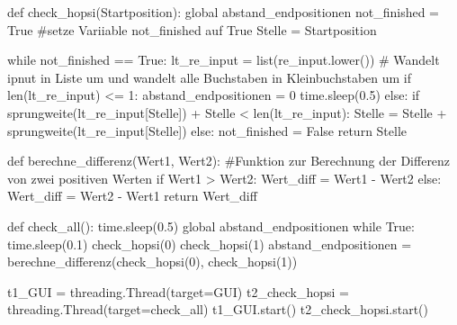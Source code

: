 \documentclass[a4paper,10pt,ngerman]{scrartcl}
\begin{document}
\begin{python}
def check_hopsi(Startposition):
    global abstand_endpositionen
    not_finished = True #setze Variiable not_finished auf True
    Stelle = Startposition

    while not_finished == True:
        lt_re_input = list(re_input.lower()) # Wandelt ipnut in Liste um und wandelt alle Buchstaben in Kleinbuchstaben um
        if len(lt_re_input) <= 1:
            abstand_endpositionen = 0
            time.sleep(0.5)
        else:
            if sprungweite(lt_re_input[Stelle]) + Stelle < len(lt_re_input):
                Stelle = Stelle + sprungweite(lt_re_input[Stelle])
            else:
                not_finished = False
    return Stelle


def berechne_differenz(Wert1, Wert2): #Funktion zur Berechnung der Differenz von zwei positiven Werten
    if Wert1 > Wert2:
        Wert_diff = Wert1 - Wert2
    else:
        Wert_diff = Wert2 - Wert1
    return Wert_diff


def check_all():
    time.sleep(0.5)
    global abstand_endpositionen
    while True:
        time.sleep(0.1)
        check_hopsi(0)
        check_hopsi(1)
        abstand_endpositionen = berechne_differenz(check_hopsi(0), check_hopsi(1))



t1_GUI = threading.Thread(target=GUI) 
t2_check_hopsi = threading.Thread(target=check_all)
t1_GUI.start()
t2_check_hopsi.start()



\end{python}
\end{document}
